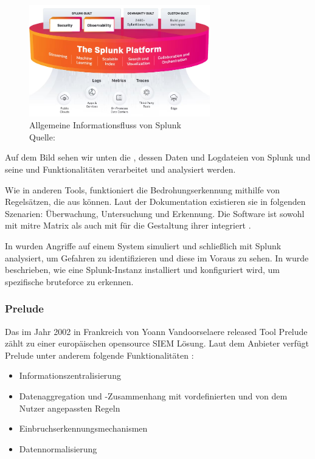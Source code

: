 \begin{figure}[H]
   \centering
   \includegraphics[width=0.7\textwidth]{assets/Splunk_informationsfluss.png}
   \caption[Allgemeine Informationsfluss von Splunk]
   {Allgemeine Informationsfluss von Splunk\\Quelle: \citep{Splunk_platform} }
   \label{fig:Allgemein_Splunk}
   \centering
\end{figure}

Auf dem Bild sehen wir unten die , dessen Daten und Logdateien von Splunk und seine  und Funktionalitäten verarbeitet und analysiert werden.

Wie in anderen Tools, funktioniert die Bedrohungserkennung mithilfe von Regelsätzen, die aus  können. Laut der Dokumentation existieren sie in folgenden Szenarien: Überwachung, Untersuchung und Erkennung. Die Software ist sowohl mit \gls{mitre} Matrix als auch mit  für die Gestaltung ihrer  integriert \citep{Splunk_usecases}. 

In \citep{Su_SplunkDDOS} wurden Angriffe auf einem System simuliert und schließlich mit Splunk analysiert, um Gefahren zu identifizieren und diese im Voraus zu sehen. In \citep{Selvaganesh_SplunkBruteForce} wurde beschrieben, wie eine Splunk-Instanz installiert und konfiguriert wird, um spezifische \gls{bruteforce} zu erkennen.
 
\subsubsection{Prelude}
Das im Jahr 2002 in Frankreich von Yoann Vandoorselaere released Tool Prelude zählt zu einer europäischen \gls{opensource} \gls{SIEM} Lösung. Laut dem Anbieter verfügt Prelude unter anderem folgende Funktionalitäten \citep{Prelude_SIEM}: 

\begin{itemize}[noitemsep]
   \item	Informationszentralisierung 
   \item	Datenaggregation und -Zusammenhang mit vordefinierten und von dem Nutzer angepassten Regeln 
   \item	Einbruchserkennungsmechanismen 
   \item	Datennormalisierung 
\end{itemize}

